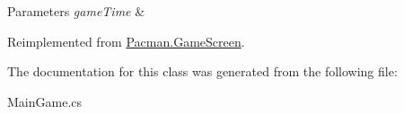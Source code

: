 \begin{DoxyParams}{Parameters}
{\em game\-Time} & \\
\hline
\end{DoxyParams}


Reimplemented from \hyperlink{class_pacman_1_1_game_screen_a768b26cbc3ed823d0dcba5055ae9a8b4}{Pacman.\-Game\-Screen}.



The documentation for this class was generated from the following file\-:\begin{DoxyCompactItemize}
\item 
Main\-Game.\-cs\end{DoxyCompactItemize}
